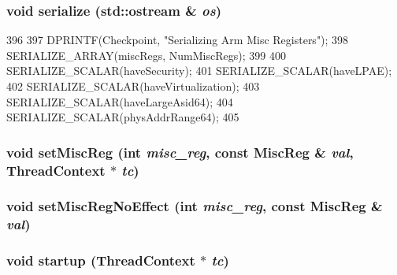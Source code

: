 \label{structArmISA_1_1ISA_a17649252f355bfda86ea00dd728d8c02}
\hypertarget{structArmISA_1_1ISA_a53e036786d17361be4c7320d39c99b84}{
\subsubsection[{serialize}]{\setlength{\rightskip}{0pt plus 5cm}void serialize (std::ostream \& {\em os})}}
\label{structArmISA_1_1ISA_a53e036786d17361be4c7320d39c99b84}



\begin{DoxyCode}
396         {
397             DPRINTF(Checkpoint, "Serializing Arm Misc Registers\n");
398             SERIALIZE_ARRAY(miscRegs, NumMiscRegs);
399 
400             SERIALIZE_SCALAR(haveSecurity);
401             SERIALIZE_SCALAR(haveLPAE);
402             SERIALIZE_SCALAR(haveVirtualization);
403             SERIALIZE_SCALAR(haveLargeAsid64);
404             SERIALIZE_SCALAR(physAddrRange64);
405         }
\end{DoxyCode}
\hypertarget{structArmISA_1_1ISA_ae4d63c6d4ee4354d39674ff8c53d9e2f}{
\subsubsection[{setMiscReg}]{\setlength{\rightskip}{0pt plus 5cm}void setMiscReg (int {\em misc\_\-reg}, \/  const {\bf MiscReg} \& {\em val}, \/  {\bf ThreadContext} $\ast$ {\em tc})}}
\label{structArmISA_1_1ISA_ae4d63c6d4ee4354d39674ff8c53d9e2f}
\hypertarget{structArmISA_1_1ISA_a763517aaea2f3decbc1ef9d064216b6f}{
\subsubsection[{setMiscRegNoEffect}]{\setlength{\rightskip}{0pt plus 5cm}void setMiscRegNoEffect (int {\em misc\_\-reg}, \/  const {\bf MiscReg} \& {\em val})}}
\label{structArmISA_1_1ISA_a763517aaea2f3decbc1ef9d064216b6f}
\hypertarget{structArmISA_1_1ISA_a769e733729615c529fdb54f538f11dba}{
\subsubsection[{startup}]{\setlength{\rightskip}{0pt plus 5cm}void startup ({\bf ThreadContext} $\ast$ {\em tc})}}
\label{structArmISA_1_1ISA_a769e733729615c529fdb54f538f11dba}




